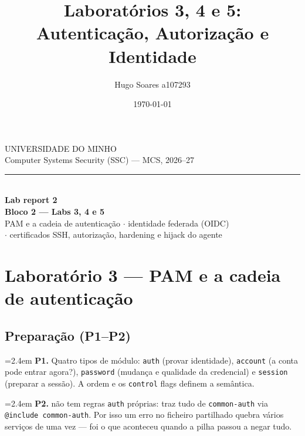 \documentclass[a4paper,11pt]{article}
\title{Laborat\'orios 3, 4 e 5: Autentica\c{c}\~ao, Autoriza\c{c}\~ao e Identidade}
\author{Hugo Soares a107293}
\date{\today}
\newenvironment{answer}[1]{%
  \par\addvspace{7pt}\noindent
  \hangindent=2.4em\hangafter=1
  {\color{sscnblue}\bfseries #1\hspace{0.55em}}\ignorespaces}
  {\par\addvspace{5pt}}
\newcommand{\cmd}[1]{\textcolor{sscnblue}{\texttt{#1}}}
\newcommand{\file}[1]{\texttt{\detokenize{#1}}}
\begin{document}
\begin{titlepage}
\thispagestyle{empty}
\begin{center}
    \vspace*{1.0cm}
    {\large\color{sscmute}\MakeUppercase{Universidade do Minho}}\\[2pt]
    {\small\color{sscmute}Computer Systems Security (SSC) --- MCS, 2026--27}\\[8pt]
    {\color{sscline}\rule{0.8\textwidth}{0.8pt}}\\[2.2cm]

    {\LARGE\bfseries\color{sscnblue}Lab report 2\\[6pt]
     Bloco 2 --- Labs 3, 4 e 5}\\[0.7cm]
    {\large\color{sscblue}PAM e a cadeia de autentica\c{c}\~ao $\cdot$ identidade federada (OIDC)\\
     $\cdot$ certificados SSH, autoriza\c{c}\~ao, hardening e hijack do agente}\\[3.0cm]

    \vfill
\end{center}
\end{titlepage}
\setcounter{page}{2}

\tableofcontents
\newpage

\section{Laborat\'orio 3 --- PAM e a cadeia de autentica\c{c}\~ao}

\subsection{Prepara\c{c}\~ao (P1--P2)}

\begin{answer}{P1.}
Quatro tipos de m\'odulo: \cmd{auth} (provar identidade), \cmd{account} (a conta pode
entrar agora?), \cmd{password} (mudan\c{c}a e qualidade da credencial) e \cmd{session}
(preparar a sess\~ao). A ordem e os \cmd{control} flags definem a sem\^antica.
\end{answer}

\begin{answer}{P2.}
\file{/etc/pam.d/sudo} n\~ao tem regras \cmd{auth} pr\'oprias: traz tudo de
\cmd{common-auth} via \cmd{@include common-auth}. Por isso um erro no ficheiro
partilhado quebra v\'arios servi\c{c}os de uma vez --- foi o que aconteceu quando a
pilha passou a negar tudo.
\end{answer}
\end{document}
